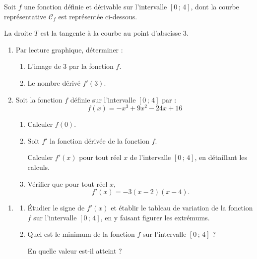 Soit $f$ une fonction définie et dérivable sur l'intervalle $[0\,;\,4]$, dont la courbe représentative $\mathcal{C}_f$ est représentée ci-dessous.

La droite $T$ est la tangente à la courbe au point d'abscisse 3.

\begin{minipage}{0.60\textwidth}
\begin{enumerate}
\item Par lecture graphique, déterminer :
\begin{enumerate}
\item L'image de 3 par la fonction $f$.
\item Le nombre dérivé $f'(3)$.
\end{enumerate}
\item Soit la fonction $f$ définie sur l'intervalle $[0\,;\,4]$ par :
\[
f(x)=-x^3+9x^2-24x+16
\]
\begin{enumerate}
\item Calculer $f(0)$.
\item Soit $f'$ la fonction dérivée de la fonction $f$.

Calculer $f'(x)$ pour tout réel $x$ de l'intervalle $[0\,;\,4]$, en détaillant les calculs.

\item Vérifier que pour tout réel $x$,
\[f'(x)=-3(x-2)(x-4).\]
\end{enumerate}
\end{enumerate}
\end{minipage}
\hfill
\begin{minipage}{0.40\textwidth}
\begin{center}
\end{center}
\end{minipage}

\begin{enumerate}
\item[]
\begin{enumerate}[start=4]
\item Étudier le signe de $f'(x)$ et établir le tableau de variation de la fonction $f$ sur l'intervalle $[0\,;\,4]$, en y faisant figurer les extrémums.

\item Quel est le minimum de la fonction $f$ sur l'intervalle $[0\,;\,4]$ ?

En quelle valeur est-il atteint ?
\end{enumerate}
\end{enumerate}
